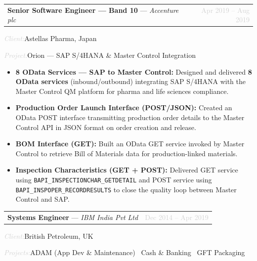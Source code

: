 \documentclass[10pt, a4paper]{article}
\makeatletter
\newcommand{\cventry}[3]{%
  \noindent
  \begin{tabularx}{\linewidth}{@{}X r@{}}
    \textbf{#1} --- \textit{#2} & \textcolor{lightgray}{\small #3}
  \end{tabularx}
  \vspace{2pt}
}
\newcommand{\clientinfo}[2]{%
  \noindent\textcolor{lightgray}{\small\textit{#1:}}\enspace#2\par
}
\makeatother
\begin{document}
\vspace{4pt}

\cventry{Senior Software Engineer --- Band 10}{Accenture plc}{Apr 2019 -- Aug 2019}
\clientinfo{Client}{Astellas Pharma, Japan}
\clientinfo{Project}{Orion --- SAP S/4HANA \& Master Control Integration}

\begin{itemize}
  \item \textbf{8 OData Services --- SAP to Master Control:}
        Designed and delivered \textbf{8 OData services} (inbound/outbound)
        integrating SAP S/4HANA with the Master Control QM platform for pharma
        and life sciences compliance.

  \item \textbf{Production Order Launch Interface (POST/JSON):}
        Created an OData POST interface transmitting production order details
        to the Master Control API in JSON format on order creation and release.

  \item \textbf{BOM Interface (GET):}
        Built an OData GET service invoked by Master Control to retrieve Bill
        of Materials data for production-linked materials.

  \item \textbf{Inspection Characteristics (GET + POST):}
        Delivered GET service using \texttt{BAPI\_INSPECTIONCHAR\_GETDETAIL}
        and POST service using \texttt{BAPI\_INSPOPER\_RECORDRESULTS} to
        close the quality loop between Master Control and SAP.
\end{itemize}

\vspace{4pt}

\cventry{Systems Engineer}{IBM India Pvt Ltd}{Dec 2014 -- Apr 2019}
\clientinfo{Client}{British Petroleum, UK}
\clientinfo{Projects}{ADAM (App Dev \& Maintenance) \textbar\ Cash \& Banking \textbar\ GFT Packaging}
\end{document}
